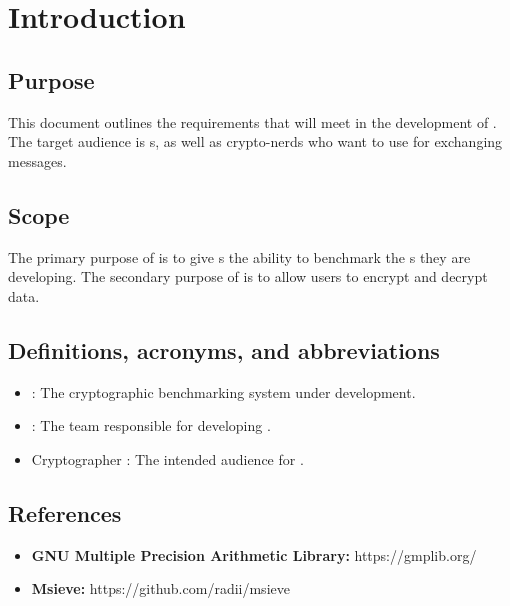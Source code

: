 \section{Introduction}
\md


\subsection{Purpose}

This document outlines the requirements that \tc{} will meet
in the development of \cry{}. The target audience is \cg s,
as well as crypto-nerds who want to use
\cry{} for exchanging messages.


\subsection{Scope}

The primary purpose of \cry{} is to give \cg s the ability
to benchmark the \cs s they are developing. The secondary
purpose of \cry{} is to allow users to encrypt and decrypt
data.


\subsection{Definitions, acronyms, and abbreviations}

\begin{itemize}
\item \cry{}: The cryptographic benchmarking system under
      development.
\item \tc{}: The team responsible for developing \cry{}.
\item Cryptographer : The intended audience for \cry{}.
\end{itemize}


\subsection{References}

\begin{itemize}
  \item \textbf{GNU Multiple Precision Arithmetic Library:}
        https://gmplib.org/
  \item \textbf{Msieve:} https://github.com/radii/msieve
\end{itemize}

